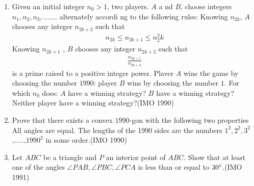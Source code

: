 \begin{enumerate}
     \item Given an initial integer $n_0 > 1$, two players. $A$ a    nd $B$, choose integers $n_1, n_2 , n_3,.......$ alternately accordi    ng to the following rules:
           Knowing $n_{2k}$, $A$ chooses any integer $n_{2k+2}$ such that \begin{align*} n_{2k}\leq n_{2k+1} \leq n^{2}_2{k} \end{align*}
   Knowing $n_{2k+1}$ , $B$ chooses any integer $n_{2k+2}$ such that \begin{align*}
              \frac{n_{2k+1}}{n_{2k+2}}\end{align*}
  is a prime raised to a positive integer power.
	Plaver $A$ wins the game by choosing the number $1990$: player $B$ wins by choosing the number $1$. For which $n_0$ does:
$A$ have a winning strategy?
 $B$ have a winning strategy?
 Neither player have a winning strategy?\hfill(IMO 1990)

\item Prove that there exists a convex $1990$-gon with the following     two properties
 All angles are equal.
 The lengths of the 1990 sides are the numbers $1^2, 2^2, 3^    2$,.....,$1990^2$ in some order.\hfill(IMO 1990)

\item Let $ABC$ be a triangle and $P$ an interior point of $ABC$.     Show that at least one of the angles $\angle{PAB}, \angle{PBC}, \angle{PCA}$ is less than or equal to $30\degree$.\hfill(IMO 1991)


\end{enumerate}

